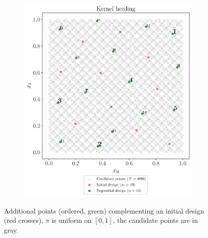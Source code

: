 \begin{figure}
\begin{subfigure}[b]{0.48\linewidth}
  \end{subfigure}
  \\
  \begin{subfigure}[b]{0.48\linewidth}
    \centering
    \includegraphics[width=\textwidth]{./part2/figures/SIS/uniform2D_KH.pdf}
  \end{subfigure}
  \caption{Additional points (ordered, green) complementing an initial design (red crosses), $\pi$ is uniform on $[0,1]$, the candidate points are in gray.}
  \label{fig:uniform_validation_designs}
\end{figure}

